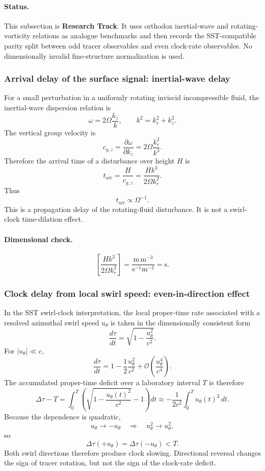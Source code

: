 \paragraph{Status.}
This subsection is \textbf{Research Track}.  It uses orthodox inertial-wave and
rotating-vorticity relations as analogue benchmarks and then records the
SST-compatible parity split between odd tracer observables and even clock-rate
observables.  No dimensionally invalid fine-structure normalization is used.

\subsubsection{Arrival delay of the surface signal: inertial-wave delay}

For a small perturbation in a uniformly rotating inviscid incompressible fluid,
the inertial-wave dispersion relation is
\[
\omega=2\Omega\frac{k_z}{k},
\qquad
k^2=k_r^2+k_z^2.
\]
The vertical group velocity is
\[
c_{g,z}=\frac{\partial\omega}{\partial k_z}
=2\Omega\frac{k_r^2}{k^3}.
\]
Therefore the arrival time of a disturbance over height \(H\) is
\[
\boxed{
t_{\mathrm{arr}}
=\frac{H}{c_{g,z}}
=\frac{Hk^3}{2\Omega k_r^2}.
}
\]
Thus
\[
\boxed{t_{\mathrm{arr}}\propto\Omega^{-1}.}
\]
This is a propagation delay of the rotating-fluid disturbance.  It is not a
swirl-clock time-dilation effect.

\paragraph{Dimensional check.}
\[
\left[\frac{Hk^3}{2\Omega k_r^2}\right]
=\frac{\mathrm{m}\,\mathrm{m^{-3}}}{\mathrm{s^{-1}m^{-2}}}
=\mathrm{s}.
\]

\subsubsection{Clock delay from local swirl speed: even-in-direction effect}

In the SST swirl-clock interpretation, the local proper-time rate associated
with a resolved azimuthal swirl speed \(u_\theta\) is taken in the dimensionally
consistent form
\[
\boxed{
\frac{d\tau}{dt}
=\sqrt{1-\frac{u_\theta^2}{c^2}}.
}
\]
For \(|u_\theta|\ll c\),
\[
\frac{d\tau}{dt}
=1-\frac{1}{2}\frac{u_\theta^2}{c^2}
+\mathcal O\!\left(\frac{u_\theta^4}{c^4}\right).
\]
The accumulated proper-time deficit over a laboratory interval \(T\) is
therefore
\[
\Delta\tau-T
=\int_0^T\left(\sqrt{1-\frac{u_\theta(t)^2}{c^2}}-1\right)dt
\approx
-\frac{1}{2c^2}\int_0^Tu_\theta(t)^2\,dt.
\]
Because the dependence is quadratic,
\[u_\theta\rightarrow-u_\theta
\quad\Longrightarrow\quad
u_\theta^2\rightarrow u_\theta^2,
\]
so
\[
\boxed{
\Delta\tau(+u_\theta)=\Delta\tau(-u_\theta)<T.
}
\]
Both swirl directions therefore produce clock slowing.  Directional reversal
changes the sign of tracer rotation, but not the sign of the clock-rate deficit.

